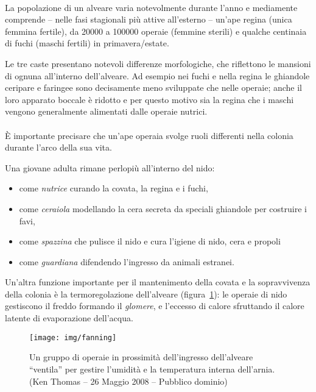 \paragraph{}
La popolazione di un alveare varia notevolmente durante l'anno e mediamente comprende
-- nelle fasi stagionali più attive all'esterno -- un'ape regina (unica femmina fertile), da 20000 a 100000 operaie (femmine sterili) e qualche centinaia di fuchi (maschi fertili) in primavera/estate.

Le tre caste presentano notevoli differenze morfologiche, che riflettono le mansioni di ognuna all'interno dell'alveare.
Ad esempio nei fuchi e nella regina le ghiandole ceripare e faringee sono decisamente meno sviluppate che nelle operaie; anche il loro apparato boccale è ridotto e per questo motivo sia la regina che i maschi vengono generalmente alimentati dalle operaie nutrici.

\paragraph{}
È importante precisare che un'ape operaia svolge ruoli differenti nella colonia durante l'arco della sua vita.

Una giovane adulta rimane perlopiù all'interno del nido:
\begin{itemize}
    \item come \emph{nutrice} curando la covata, la regina e i fuchi,
    \item come \emph{ceraiola} modellando la cera secreta da speciali ghiandole per costruire i favi,
    \item come \emph{spazzina} che pulisce il nido e cura l'igiene di nido, cera e propoli
    \item come \emph{guardiana} difendendo l'ingresso da animali estranei.
\end{itemize}

Un'altra funzione importante per il mantenimento della covata e la sopravvivenza della colonia
è la termoregolazione dell'alveare (figura~\ref{img:fanning}):
le operaie di nido gestiscono il freddo formando il \emph{glomere}, e l'eccesso di calore sfruttando il calore latente di evaporazione dell'acqua.

\begin{figure}[hbp]
    \centering
    \texttt{[image: img/fanning]}

    \caption[Ventilazione forzata per raffrescare l'interno dell'arnia.]{Un gruppo di operaie in
        prossimità dell'ingresso dell'alveare ``ventila'' per gestire l'umidità e la temperatura
        interna dell'arnia.
        \\ (Ken Thomas -- 26 Maggio 2008 -- Pubblico dominio)
    }
    \label{img:fanning}
\end{figure}


